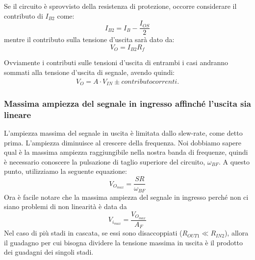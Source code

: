 \documentclass[a4paper,twocolumn,notitlepage]{book}
\begin{document}
	Se il circuito è sprovvisto della resistenza di protezione, occorre considerare il contributo di $I_{B2}$ come:
	\begin{equation}
		I_{B2}=I_B-\frac{I_{OS}}{2}
	\end{equation}
	mentre il contributo sulla tensione d'uscita sarà dato da:
	\begin{equation}
		V_O=I_{B2}R_f
	\end{equation}
	
	Ovviamente i contributi sulle tensioni d'uscita di entrambi i casi andranno sommati alla tensione d'uscita di segnale, avendo quindi:
	\begin{align*}
		V_O=A \cdot V_{IN} \pm contributo correnti.
	\end{align*}
	
	\subsubsection*{Massima ampiezza del segnale in ingresso affinché l'uscita sia lineare}
	L'ampiezza massima del segnale in uscita è limitata dallo slew-rate, come detto prima. L'ampiezza diminuisce al crescere della frequenza. Noi dobbiamo sapere qual è la massima ampiezza raggiungibile nella nostra banda di frequenze, quindi è necessario conoscere la pulsazione di taglio superiore del circuito, $\omega_{BF}$.\newline
	A questo punto, utilizziamo la seguente equazione:
	\begin{equation}
		V_{O_{max}}=\frac{SR}{\omega_{BF}}
	\end{equation}
	Ora è facile notare che la massima ampiezza del segnale in ingresso perché non ci siano problemi di non linearità è data da
	\begin{equation}
		V_{i_{max}}=\frac{V_{O_{max}}}{A_F}
	\end{equation}
	Nel caso di più stadi in cascata, se essi sono disaccoppiati ($R_{OUT1} \ll R_{IN2}$), allora il guadagno per cui bisogna dividere la tensione massima in uscita è il prodotto dei guadagni dei singoli stadi.
\end{document}
